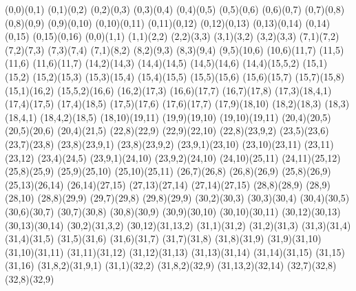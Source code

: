 \begin{sseqpage}[ classes = fill, class labels = {right = 0.02em }, xscale = 0.7, yscale=0.7, axes gap = 0.6cm ]
\structline(0,0)(0,1)
\structline(0,1)(0,2)
\structline(0,2)(0,3)
\structline(0,3)(0,4)
\structline(0,4)(0,5)
\structline(0,5)(0,6)
\structline(0,6)(0,7)
\structline(0,7)(0,8)
\structline(0,8)(0,9)
\structline(0,9)(0,10)
\structline(0,10)(0,11)
\structline(0,11)(0,12)
\structline(0,12)(0,13)
\structline(0,13)(0,14)
\structline(0,14)(0,15)
\structline(0,15)(0,16)
\structline(0,0)(1,1)
\structline(1,1)(2,2)
\structline(2,2)(3,3)
\structline(3,1)(3,2)
\structline(3,2)(3,3)
\structline(7,1)(7,2)
\structline(7,2)(7,3)
\structline(7,3)(7,4)
\structline(7,1)(8,2)
\structline(8,2)(9,3)
\structline(8,3)(9,4)
\structline(9,5)(10,6)
\structline(10,6)(11,7)
\structline(11,5)(11,6)
\structline(11,6)(11,7)
\structline(14,2)(14,3)
\structline(14,4)(14,5)
\structline(14,5)(14,6)
\structline(14,4)(15,5,2)
\structline(15,1)(15,2)
\structline(15,2)(15,3)
\structline(15,3)(15,4)
\structline(15,4)(15,5)
\structline(15,5)(15,6)
\structline(15,6)(15,7)
\structline(15,7)(15,8)
\structline(15,1)(16,2)
\structline(15,5,2)(16,6)
\structline(16,2)(17,3)
\structline(16,6)(17,7)
\structline(16,7)(17,8)
\structline(17,3)(18,4,1)
\structline(17,4)(17,5)
\structline(17,4)(18,5)
\structline(17,5)(17,6)
\structline(17,6)(17,7)
\structline(17,9)(18,10)
\structline(18,2)(18,3)
\structline(18,3)(18,4,1)
\structline(18,4,2)(18,5)
\structline(18,10)(19,11)
\structline(19,9)(19,10)
\structline(19,10)(19,11)
\structline(20,4)(20,5)
\structline(20,5)(20,6)
\structline(20,4)(21,5)
\structline(22,8)(22,9)
\structline(22,9)(22,10)
\structline(22,8)(23,9,2)
\structline(23,5)(23,6)
\structline(23,7)(23,8)
\structline(23,8)(23,9,1)
\structline(23,8)(23,9,2)
\structline(23,9,1)(23,10)
\structline(23,10)(23,11)
\structline(23,11)(23,12)
\structline(23,4)(24,5)
\structline(23,9,1)(24,10)
\structline(23,9,2)(24,10)
\structline(24,10)(25,11)
\structline(24,11)(25,12)
\structline(25,8)(25,9)
\structline(25,9)(25,10)
\structline(25,10)(25,11)
\structline(26,7)(26,8)
\structline(26,8)(26,9)
\structline(25,8)(26,9)
\structline(25,13)(26,14)
\structline(26,14)(27,15)
\structline(27,13)(27,14)
\structline(27,14)(27,15)
\structline(28,8)(28,9)
\structline(28,9)(28,10)
\structline(28,8)(29,9)
\structline(29,7)(29,8)
\structline(29,8)(29,9)
\structline(30,2)(30,3)
\structline(30,3)(30,4)
\structline(30,4)(30,5)
\structline(30,6)(30,7)
\structline(30,7)(30,8)
\structline(30,8)(30,9)
\structline(30,9)(30,10)
\structline(30,10)(30,11)
\structline(30,12)(30,13)
\structline(30,13)(30,14)
\structline(30,2)(31,3,2)
\structline(30,12)(31,13,2)
\structline(31,1)(31,2)
\structline(31,2)(31,3)
\structline(31,3)(31,4)
\structline(31,4)(31,5)
\structline(31,5)(31,6)
\structline(31,6)(31,7)
\structline(31,7)(31,8)
\structline(31,8)(31,9)
\structline(31,9)(31,10)
\structline(31,10)(31,11)
\structline(31,11)(31,12)
\structline(31,12)(31,13)
\structline(31,13)(31,14)
\structline(31,14)(31,15)
\structline(31,15)(31,16)
\structline(31,8,2)(31,9,1)
\structline(31,1)(32,2)
\structline(31,8,2)(32,9)
\structline(31,13,2)(32,14)
\structline(32,7)(32,8)
\structline(32,8)(32,9)


\end{sseqpage}
